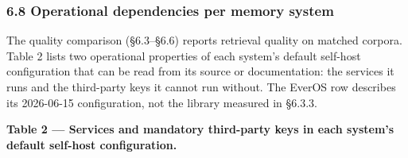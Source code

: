 \documentclass[
]{article}
\begin{document}
\subsubsection{6.8 Operational dependencies per memory
system}\label{operational-dependencies-per-memory-system}

The quality comparison (§6.3--§6.6) reports retrieval quality on matched
corpora. Table 2 lists two operational properties of each system's
default self-host configuration that can be read from its source or
documentation: the services it runs and the third-party keys it cannot
run without. The EverOS row describes its 2026-06-15 configuration, not
the library measured in §6.3.3.

\textbf{Table 2 --- Services and mandatory third-party keys in each
system's default self-host configuration.}
\end{document}
